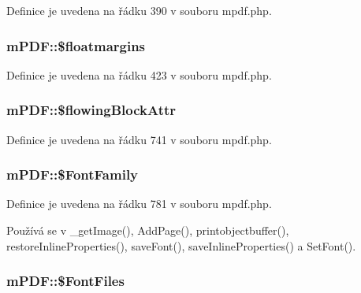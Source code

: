Definice je uvedena na řádku 390 v souboru mpdf.\-php.

\hypertarget{classm_p_d_f_ab21bb984d9fc855a0077b9b68a371541}{
\subsubsection[{\$floatmargins}]{\setlength{\rightskip}{0pt plus 5cm}m\-P\-D\-F\-::\$floatmargins}}\label{classm_p_d_f_ab21bb984d9fc855a0077b9b68a371541}


Definice je uvedena na řádku 423 v souboru mpdf.\-php.

\hypertarget{classm_p_d_f_abf66af5e929366cc04ad79c3579b51aa}{
\subsubsection[{\$flowing\-Block\-Attr}]{\setlength{\rightskip}{0pt plus 5cm}m\-P\-D\-F\-::\$flowing\-Block\-Attr}}\label{classm_p_d_f_abf66af5e929366cc04ad79c3579b51aa}


Definice je uvedena na řádku 741 v souboru mpdf.\-php.

\hypertarget{classm_p_d_f_a1c1c461eafab6a8d03e8cfee9a41a211}{
\subsubsection[{\$\-Font\-Family}]{\setlength{\rightskip}{0pt plus 5cm}m\-P\-D\-F\-::\$\-Font\-Family}}\label{classm_p_d_f_a1c1c461eafab6a8d03e8cfee9a41a211}


Definice je uvedena na řádku 781 v souboru mpdf.\-php.



Používá se v \-\_\-get\-Image(), Add\-Page(), printobjectbuffer(), restore\-Inline\-Properties(), save\-Font(), save\-Inline\-Properties() a Set\-Font().

\hypertarget{classm_p_d_f_a792819043f0aa35f8c370aa5e8d9f4c5}{
\subsubsection[{\$\-Font\-Files}]{\setlength{\rightskip}{0pt plus 5cm}m\-P\-D\-F\-::\$\-Font\-Files}}\label{classm_p_d_f_a792819043f0aa35f8c370aa5e8d9f4c5}


